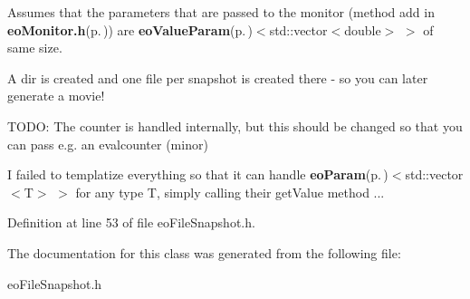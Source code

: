 Assumes that the parameters that are passed to the monitor (method add in {\bf eo\-Monitor.h}{\rm (p.\,\pageref{eo_monitor_8h})}) are {\bf eo\-Value\-Param}{\rm (p.\,\pageref{classeo_value_param})}$<$std::vector$<$double$>$ $>$ of same size.

A dir is created and one file per snapshot is created there - so you can later generate a movie!

TODO: The counter is handled internally, but this should be changed so that you can pass e.g. an evalcounter (minor)

I failed to templatize everything so that it can handle {\bf eo\-Param}{\rm (p.\,\pageref{classeo_param})}$<$std::vector$<$T$>$ $>$ for any type T, simply calling their get\-Value method ... 



Definition at line 53 of file eo\-File\-Snapshot.h.

The documentation for this class was generated from the following file:\begin{CompactItemize}
\item 
eo\-File\-Snapshot.h\end{CompactItemize}

